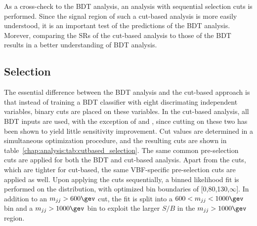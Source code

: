 
As a cross-check to the BDT analysis, an analysis with sequential
selection cuts is performed. Since the signal region of such a cut-based
analysis is more easily understood, it is an important test of the
predictions of the BDT analysis. Morever, comparing the SRs of the
cut-based analysis to those of the BDT results in a better
understanding of BDT analysis. 

\subsection{Selection}

The essential difference between the BDT analysis and the cut-based
approach is that instead of training a BDT classifier with eight
discrimating independent variables, binary cuts are placed on these
variables. In the cut-based analysis, all BDT inputs are used, with
the exception of \SumMlj and \lepEtaCent, since cutting on these two has been
shown to yield little sensitivity improvement. Cut values are
determined in a simultaneous optimization procedure, and the resulting
cuts are shown in
table~\ref{chap:analysis:tab:cutbased_selection}. The same common
pre-selection cuts are
applied for both the BDT and cut-based analysis. Apart from the
\etmiss cuts, which are tighter for cut-based, the same VBF-specific
pre-selection cuts are applied as well. Upon applying the cuts
sequentially, a binned likelihood fit is performed on the \mT
distribution, with optimized bin boundaries of [0,80,130,$\infty$]. In
addition to an $\mjj > 600 \gev$ cut, the \mT fit is split into a $600
< \mjj < 1000 \gev$ bin and a $\mjj > 1000 \gev$ bin to exploit the
larger $S/B$ in the $\mjj > 1000 \gev$ region. 


